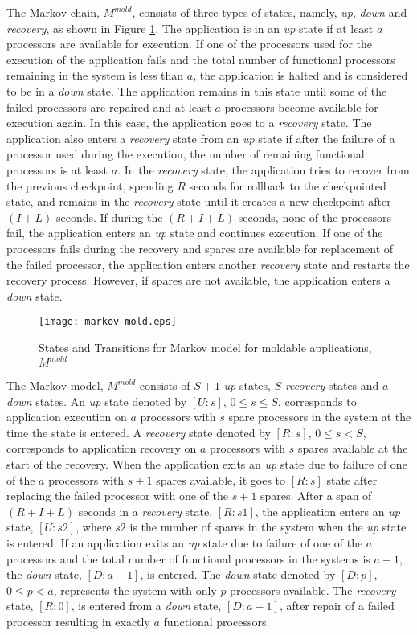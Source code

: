 \documentclass[conference,10pt]{IEEEtran}
\begin{document}
The Markov chain, $M^{mold}$, consists of three types of states,
namely, {\em up}, {\em down} and {\em recovery}, as shown in Figure
\ref{markov-mold}. The application is in
an {\em up} state if at least $a$ processors are available for
execution. If one of the processors used for the execution of the
application fails and the total number of functional processors
remaining in the system is less than $a$, the application is halted
and is considered to be in a {\em down} state. The application remains in
this state until some of the failed processors are repaired and at
least $a$ processors become available for execution again. In this
case, the application goes to a {\em recovery} state. The application also
enters a {\em recovery} state from an {\em up} state if after the failure of a
processor used during the execution, the number of remaining
functional processors is at least $a$. In the {\em recovery} state, the
application tries to recover from the previous checkpoint, spending
$R$ seconds for rollback to the checkpointed state, and remains in the
{\em recovery} state until it creates a new checkpoint after $(I+L)$
seconds. If during the $(R+I+L)$ seconds, none of the processors fail, the
application enters an {\em up} state and continues execution. If one of the
processors fails during the recovery and spares are available for
replacement of the failed processor, the application enters another
{\em recovery} state and restarts the recovery process. However, if spares
are not available, the application enters a {\em down} state.
\begin{figure}
\centering
\texttt{[image: markov-mold.eps]}
\caption{States and Transitions for Markov model for moldable
  applications, $M^{mold}$}
\label{markov-mold}
\end{figure}

The Markov model, $M^{mold}$ consists of $S+1$ {\em up} states, $S$
{\em recovery} states and $a$ {\em down} states. An {\em up} state
denoted by $[U:s]$, $0\leq s\leq S$, corresponds to application
execution on $a$ processors with $s$ spare processors in the system at
the time the state is entered. A {\em recovery} state denoted by
$[R:s]$, $0\leq s< S$, corresponds to application recovery on $a$
processors with $s$ spares available at the start of the
recovery. When the application exits an {\em up} state due to failure
of one of the $a$ processors with $s+1$ spares available, it goes to
$[R:s]$ state after replacing the failed processor with one of the
$s+1$ spares. After a span of $(R+I+L)$ seconds in a {\em recovery}
state, $[R:s1]$, the application enters an {\em up} state, $[U:s2]$,
where $s2$ is the number of spares in the system when the {\em up}
state is entered. If an application exits an {\em up} state due to
failure of one of the $a$ processors and the total number of
functional processors in the systems is $a-1$, the {\em down} state,
$[D:a-1]$, is entered. The {\em down} state denoted by $[D:p]$, $0\leq
p<a$, represents the system with only $p$ processors available. The
{\em recovery} state, $[R:0]$, is entered from a {\em down} state,
$[D:a-1]$, after repair of a failed processor resulting in exactly $a$
functional processors.
\end{document}
